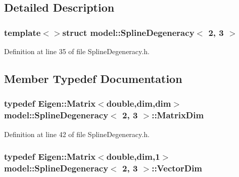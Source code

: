 \subsection{Detailed Description}
\subsubsection*{template$<$$>$struct model\+::\+Spline\+Degeneracy$<$ 2, 3 $>$}



Definition at line 35 of file Spline\+Degeneracy.\+h.



\subsection{Member Typedef Documentation}
\hypertarget{structmodel_1_1_spline_degeneracy_3_012_00_013_01_4_afecd7765c4d18724c939c298569d0973}{}
\subsubsection[{Matrix\+Dim}]{\setlength{\rightskip}{0pt plus 5cm}typedef Eigen\+::\+Matrix$<$double,{\bf dim},{\bf dim}$>$ {\bf model\+::\+Spline\+Degeneracy}$<$ 2, 3 $>$\+::{\bf Matrix\+Dim}}\label{structmodel_1_1_spline_degeneracy_3_012_00_013_01_4_afecd7765c4d18724c939c298569d0973}


Definition at line 42 of file Spline\+Degeneracy.\+h.

\hypertarget{structmodel_1_1_spline_degeneracy_3_012_00_013_01_4_a57ac76273205b30ddcff84d77d3e5738}{}
\subsubsection[{Vector\+Dim}]{\setlength{\rightskip}{0pt plus 5cm}typedef Eigen\+::\+Matrix$<$double,{\bf dim},1$>$ {\bf model\+::\+Spline\+Degeneracy}$<$ 2, 3 $>$\+::{\bf Vector\+Dim}}\label{structmodel_1_1_spline_degeneracy_3_012_00_013_01_4_a57ac76273205b30ddcff84d77d3e5738}


